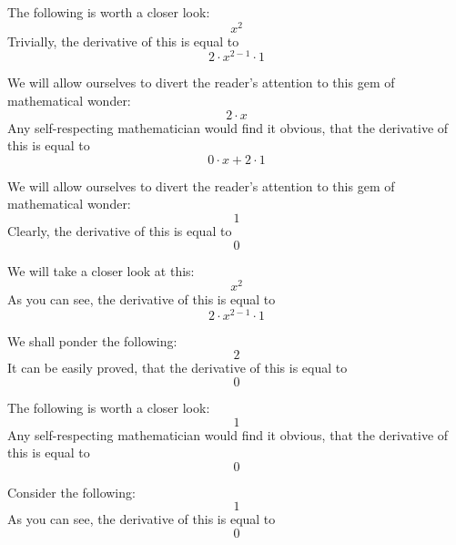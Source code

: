 \documentclass{article}
\begin{document}
The following is worth a closer look:
\begin{equation}
x ^{2 } 
\end{equation}
Trivially, the derivative of this is equal to
\begin{equation}
2 \cdot x ^{2 - 1 } \cdot 1 
\end{equation}

We will allow ourselves to divert the reader's attention to this gem of mathematical wonder:
\begin{equation}
2 \cdot x 
\end{equation}
Any self-respecting mathematician would find it obvious, that the derivative of this is equal to
\begin{equation}
0 \cdot x + 2 \cdot 1 
\end{equation}

We will allow ourselves to divert the reader's attention to this gem of mathematical wonder:
\begin{equation}
1 
\end{equation}
Clearly, the derivative of this is equal to
\begin{equation}
0 
\end{equation}

We will take a closer look at this:
\begin{equation}
x ^{2 } 
\end{equation}
As you can see, the derivative of this is equal to
\begin{equation}
2 \cdot x ^{2 - 1 } \cdot 1 
\end{equation}

We shall ponder the following:
\begin{equation}
2 
\end{equation}
It can be easily proved, that the derivative of this is equal to
\begin{equation}
0 
\end{equation}

The following is worth a closer look:
\begin{equation}
1 
\end{equation}
Any self-respecting mathematician would find it obvious, that the derivative of this is equal to
\begin{equation}
0 
\end{equation}

Consider the following:
\begin{equation}
1 
\end{equation}
As you can see, the derivative of this is equal to
\begin{equation}
0 
\end{equation}
\end{document}
